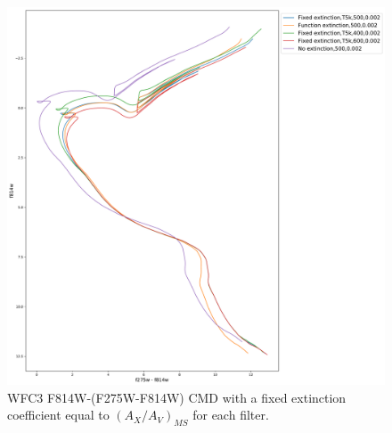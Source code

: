 \documentclass[12pt, a4paper]{report}
\begin{document}
\begin{figure}[h]
\begin{center}
\includegraphics[width=1.0\textwidth]{../basti_isochrones_10_13Gyr/Extinction_T5k_FeH0fix_func_f814w_f275wmf814w_500_400_600_Myr_FeH_0p002_ref_noext_Av_1p0.pdf}
\caption{WFC3 F814W-(F275W-F814W) CMD with a fixed extinction coefficient equal to $(A_{X}/A_{V})_{MS}$ for each filter.}
\label{wfc3_isoc2_T5k}
\end{center}
\end{figure}
\end{document}
